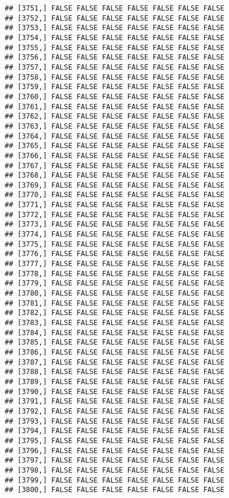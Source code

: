 \documentclass[
]{article}
\begin{document}
\begin{verbatim}
## [3751,] FALSE FALSE FALSE FALSE FALSE FALSE FALSE
## [3752,] FALSE FALSE FALSE FALSE FALSE FALSE FALSE
## [3753,] FALSE FALSE FALSE FALSE FALSE FALSE FALSE
## [3754,] FALSE FALSE FALSE FALSE FALSE FALSE FALSE
## [3755,] FALSE FALSE FALSE FALSE FALSE FALSE FALSE
## [3756,] FALSE FALSE FALSE FALSE FALSE FALSE FALSE
## [3757,] FALSE FALSE FALSE FALSE FALSE FALSE FALSE
## [3758,] FALSE FALSE FALSE FALSE FALSE FALSE FALSE
## [3759,] FALSE FALSE FALSE FALSE FALSE FALSE FALSE
## [3760,] FALSE FALSE FALSE FALSE FALSE FALSE FALSE
## [3761,] FALSE FALSE FALSE FALSE FALSE FALSE FALSE
## [3762,] FALSE FALSE FALSE FALSE FALSE FALSE FALSE
## [3763,] FALSE FALSE FALSE FALSE FALSE FALSE FALSE
## [3764,] FALSE FALSE FALSE FALSE FALSE FALSE FALSE
## [3765,] FALSE FALSE FALSE FALSE FALSE FALSE FALSE
## [3766,] FALSE FALSE FALSE FALSE FALSE FALSE FALSE
## [3767,] FALSE FALSE FALSE FALSE FALSE FALSE FALSE
## [3768,] FALSE FALSE FALSE FALSE FALSE FALSE FALSE
## [3769,] FALSE FALSE FALSE FALSE FALSE FALSE FALSE
## [3770,] FALSE FALSE FALSE FALSE FALSE FALSE FALSE
## [3771,] FALSE FALSE FALSE FALSE FALSE FALSE FALSE
## [3772,] FALSE FALSE FALSE FALSE FALSE FALSE FALSE
## [3773,] FALSE FALSE FALSE FALSE FALSE FALSE FALSE
## [3774,] FALSE FALSE FALSE FALSE FALSE FALSE FALSE
## [3775,] FALSE FALSE FALSE FALSE FALSE FALSE FALSE
## [3776,] FALSE FALSE FALSE FALSE FALSE FALSE FALSE
## [3777,] FALSE FALSE FALSE FALSE FALSE FALSE FALSE
## [3778,] FALSE FALSE FALSE FALSE FALSE FALSE FALSE
## [3779,] FALSE FALSE FALSE FALSE FALSE FALSE FALSE
## [3780,] FALSE FALSE FALSE FALSE FALSE FALSE FALSE
## [3781,] FALSE FALSE FALSE FALSE FALSE FALSE FALSE
## [3782,] FALSE FALSE FALSE FALSE FALSE FALSE FALSE
## [3783,] FALSE FALSE FALSE FALSE FALSE FALSE FALSE
## [3784,] FALSE FALSE FALSE FALSE FALSE FALSE FALSE
## [3785,] FALSE FALSE FALSE FALSE FALSE FALSE FALSE
## [3786,] FALSE FALSE FALSE FALSE FALSE FALSE FALSE
## [3787,] FALSE FALSE FALSE FALSE FALSE FALSE FALSE
## [3788,] FALSE FALSE FALSE FALSE FALSE FALSE FALSE
## [3789,] FALSE FALSE FALSE FALSE FALSE FALSE FALSE
## [3790,] FALSE FALSE FALSE FALSE FALSE FALSE FALSE
## [3791,] FALSE FALSE FALSE FALSE FALSE FALSE FALSE
## [3792,] FALSE FALSE FALSE FALSE FALSE FALSE FALSE
## [3793,] FALSE FALSE FALSE FALSE FALSE FALSE FALSE
## [3794,] FALSE FALSE FALSE FALSE FALSE FALSE FALSE
## [3795,] FALSE FALSE FALSE FALSE FALSE FALSE FALSE
## [3796,] FALSE FALSE FALSE FALSE FALSE FALSE FALSE
## [3797,] FALSE FALSE FALSE FALSE FALSE FALSE FALSE
## [3798,] FALSE FALSE FALSE FALSE FALSE FALSE FALSE
## [3799,] FALSE FALSE FALSE FALSE FALSE FALSE FALSE
## [3800,] FALSE FALSE FALSE FALSE FALSE FALSE FALSE

\end{verbatim}
\end{document}
